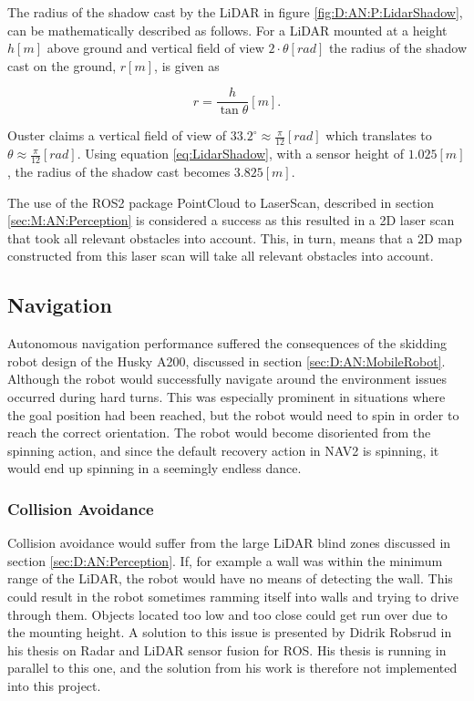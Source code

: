 The radius of the shadow cast by the LiDAR in figure \ref{fig:D:AN:P:LidarShadow}, can be mathematically described as follows. For a LiDAR mounted at a height $h[m]$ above ground and vertical field of view $2\cdot\theta[rad]$ the radius of the shadow cast on the ground, $r[m]$, is given as

\begin{equation} \label{eq:LidarShadow}
    r = \frac{h}{\tan{\theta}}[m].
\end{equation}

Ouster claims a vertical field of view of $33.2^\circ \approx\frac{\pi}{12}[rad]$ \cite{OS1_datasheet} which translates to $\theta\approx\frac{\pi}{12}[rad]$. Using equation \ref{eq:LidarShadow}, with a sensor height of $1.025[m]$, the radius of the shadow cast becomes $3.825[m]$.

The use of the ROS2 package PointCloud to LaserScan, described in section \ref{sec:M:AN:Perception} is considered a success as this resulted in a 2D laser scan that took all relevant obstacles into account. This, in turn, means that a 2D map constructed from this laser scan will take all relevant obstacles into account.

\subsection{Navigation}\label{sec:D:AN:Navigation}
Autonomous navigation performance suffered the consequences of the skidding robot design of the Husky A200, discussed in section \ref{sec:D:AN:MobileRobot}. Although the robot would successfully navigate around the environment issues occurred during hard turns. This was especially prominent in situations where the goal position had been reached, but the robot would need to spin in order to reach the correct orientation. The robot would become disoriented from the spinning action, and since the default recovery action in NAV2 is spinning, it would end up spinning in a seemingly endless dance.

\subsubsection{Collision Avoidance}
Collision avoidance would suffer from the large LiDAR blind zones discussed in section \ref{sec:D:AN:Perception}. If, for example a wall was within the minimum range of the LiDAR, the robot would have no means of detecting the wall. This could result in the robot sometimes ramming itself into walls and trying to drive through them. Objects located too low and too close could get run over due to the mounting height. A solution to this issue is presented by Didrik Robsrud in his thesis on Radar and LiDAR sensor fusion for ROS. His thesis is running in parallel to this one, and the solution from his work is therefore not implemented into this project.

